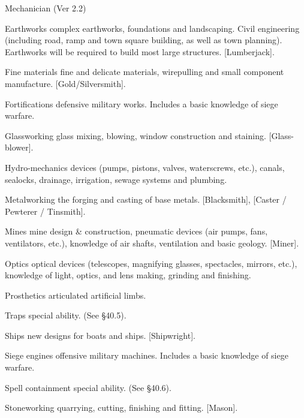 \begin{Chapter}{Mechanician (Ver 2.2)}
\begin{Description}
\item[Earthworks] complex earthworks, foundations and landscaping.
  Civil engineering (including road, ramp and town square building, as
  well as town planning).  Earthworks will be required to build most
  large structures. [Lumberjack].

\item[Fine] materials fine and delicate materials, wirepulling and
  small component manufacture.  [Gold/Silversmith].

\item[Fortifications] defensive military works. Includes a basic
  knowledge of siege warfare.

\item[Glassworking] glass mixing, blowing, window construction and
  staining. [Glass-blower].

\item[Hydro-mechanics] devices (pumps, pistons, valves, waterscrews,
  etc.), canals, sealocks, drainage, irrigation, sewage systems and
  plumbing.

\item[Metalworking] the forging and casting of base metals.
  [Blacksmith], [Caster / Pewterer / Tinsmith].

\item[Mines] mine design \& construction, pneumatic devices (air
  pumps, fans, ventilators, etc.), knowledge of air shafts,
  ventilation and basic geology.  [Miner].

\item[Optics] optical devices (telescopes, magnifying glasses,
  spectacles, mirrors, etc.), knowledge of light, optics, and lens
  making, grinding and finishing.

\item[Prosthetics] articulated artificial limbs. 

\item[Traps] special ability. (See §40.5). 

\item[Ships] new designs for boats and ships.  [Shipwright].

\item[Siege] engines offensive military machines.  Includes a basic
  knowledge of siege warfare.

\item[Spell containment] special ability. (See §40.6).

\item[Stoneworking] quarrying, cutting, finishing and
  fitting. [Mason].


\end{Description}
\end{Chapter}
